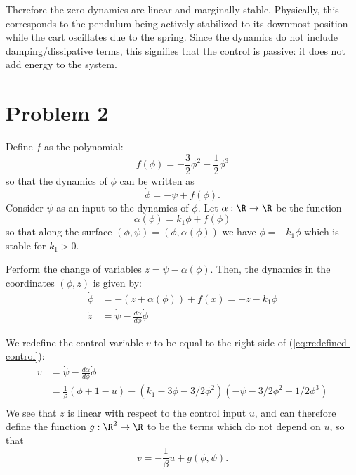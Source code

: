 \documentclass{homework}
\begin{document}
\begin{letterenum}
Therefore the zero dynamics are linear and marginally stable. Physically,
this corresponds to the pendulum being actively stabilized to its
downmost position while the cart oscillates due to the spring. Since the 
dynamics do not include damping/dissipative terms, this signifies that the control
is passive: it does not add energy to the system.

\end{letterenum}

\section{Problem 2}
Define $f$ as the polynomial:
\begin{equation*}
    f(\phi) = -\frac{3}{2} \phi^2 - \frac{1}{2} \phi^3
\end{equation*}
so that the dynamics of $\phi$ can be written as
\begin{equation*}
    \dot{\phi} = - \psi + f(\phi).
\end{equation*}
Consider $\psi$ as an input to the dynamics of $\phi$. Let $\alpha: \R \to \R$
be the function
\begin{equation*}
    \alpha(\phi) = k_1 \phi + f(\phi)
\end{equation*}
so that along the surface $(\phi, \psi) = (\phi, \alpha(\phi))$
we have $\dot{\phi} = -k_1 \phi$ which is stable for $k_1 > 0$.

Perform the change of variables $z = \psi - \alpha(\phi)$.
Then, the dynamics in the coordinates $(\phi, z)$ is given by:
\begin{align}
    \dot{\phi} &= - (z + \alpha(\phi)) + f(x) = -z - k_1 \phi \\
    \dot{z} &= \dot{\psi} - \frac{d\alpha}{d\phi} \dot{\phi}
    \label{eq:redefined-control}
\end{align}

We redefine the control variable $v$ to be equal to the right side of
(\ref{eq:redefined-control}):
\begin{align*}
v &= \dot{\psi} - \frac{d\alpha}{d\phi} \dot{\phi} \\
    &= \frac{1}{\beta}(\phi + 1 - u) - (k_1 - 3\phi - 3/2 \phi^2)
        ( - \psi - 3/2 \phi^2 - 1/2 \phi^3) \\
\end{align*}
We see that $\dot{z}$ is linear with respect to the control input $u$,
and can therefore define the function $g: \R^2 \to \R$ to be the terms which do
not depend on $u$, so that
\begin{equation*}
    v = -\frac{1}{\beta} u + g(\phi, \psi).
\end{equation*}
\end{document}
